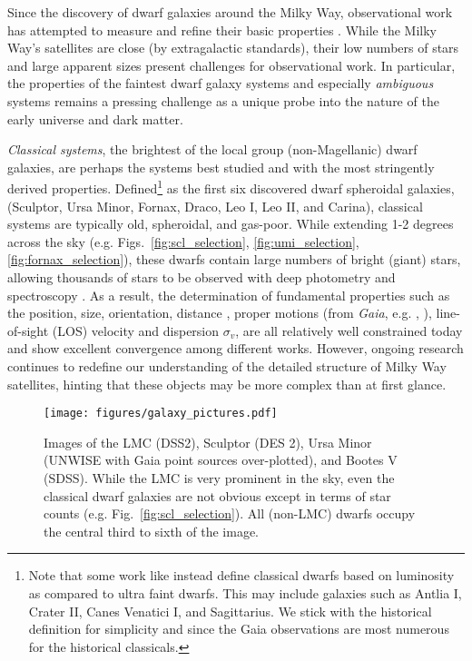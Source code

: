 Since the discovery of dwarf galaxies around the Milky Way,
observational work has attempted to measure and refine their basic
properties \citep[e.g.][]{mateo1998}. While the Milky Way's satellites
are close (by extragalactic standards), their low numbers of stars and
large apparent sizes present challenges for observational work. In
particular, the properties of the faintest dwarf galaxy systems and
especially \emph{ambiguous} systems remains a pressing challenge as a
unique probe into the nature of the early universe and dark matter.

\emph{Classical systems}, the brightest of the local group
(non-Magellanic) dwarf galaxies, are perhaps the systems best studied
and with the most stringently derived properties. Defined\footnote{Note
  that some work like \citet{simon2019} instead define classical dwarfs
  based on luminosity as compared to ultra faint dwarfs. This may
  include galaxies such as Antlia I, Crater II, Canes Venatici I, and
  Sagittarius. We stick with the historical definition for simplicity
  and since the Gaia observations are most numerous for the historical
  classicals.} as the first six discovered dwarf spheroidal galaxies,
(Sculptor, Ursa Minor, Fornax, Draco, Leo I, Leo II, and Carina),
classical systems are typically old, spheroidal, and gas-poor. While
extending 1-2 degrees across the sky (e.g.
Figs.~\ref{fig:scl_selection}, \ref{fig:umi_selection}, \ref{fig:fornax_selection}),
these dwarfs contain large numbers of bright (giant) stars, allowing
thousands of stars to be observed with deep photometry and spectroscopy
\citep[e.g.][\citet{pace+2020}]{tolstoy+2023}. As a result, the
determination of fundamental properties such as the position, size,
orientation, distance \citep[from 100s of RRL stars,
e.g.][]{tran+2022, garofalo+2025}, proper motions (from \emph{Gaia},
e.g. \citet{battaglia+2022}, \citet{MV2020a}), line-of-sight (LOS)
velocity and dispersion \(\sigma_v\), are all relatively well
constrained today and show excellent convergence among different works.
However, ongoing research continues to redefine our understanding of the
detailed structure of Milky Way satellites, hinting that these objects
may be more complex than at first glance.

\begin{figure}
\centering
\texttt{[image: figures/galaxy\_pictures.pdf]}
\caption[Dwarf Galaxy Pictures]{Images of the LMC (DSS2), Sculptor (DES
2), Ursa Minor (UNWISE with Gaia point sources over-plotted), and Bootes
V (SDSS). While the LMC is very prominent in the sky, even the classical
dwarf galaxies are not obvious except in terms of star counts (e.g.
Fig.~\ref{fig:scl_selection}). All (non-LMC) dwarfs occupy the central
third to sixth of the image.}\label{fig:galaxy_images}
\end{figure}

